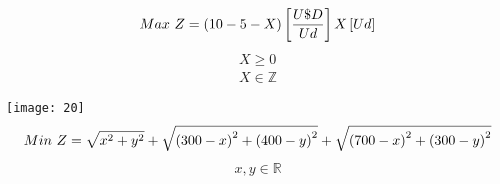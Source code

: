 \documentclass{tarea}
\begin{document}
\begin{homeworkProblem}
\begin{equation}
  Max\ Z = \left( 10 - 5 -X \right)\left[ \frac{U\$D}{Ud} \right]X\left[ Ud \right]
\end{equation}
\begin{align*}
  X \ge 0 \\
  X \in \mathbb{Z}
\end{align*}
\end{homeworkProblem}


\begin{homeworkProblem}
\texttt{[image: 20]}
\begin{equation}
  Min\ Z = \sqrt{x^2 + y^2} + \sqrt{\left( 300 - x \right)^2 + \left( 400 - y \right)^2} + \sqrt{\left( 700-x \right)^2 + \left( 300 - y \right)^2}
\end{equation}
\begin{align*}
  x,y \in \mathbb{R}
\end{align*}
\end{homeworkProblem}
\end{document}
